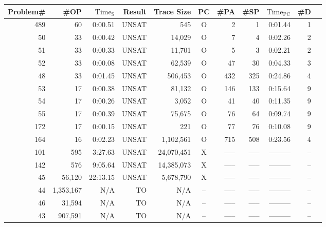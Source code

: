 \begin{table}[h]
  \begin{center}
    \begin{tabular}{|r||r|r|r||r||c|r|r|r|r|r|}
      \hline
      Problem\#&  \#OP  & $\mathrm{Time_S}$&    Result&     Trace Size& PC&  \#PA& \#SP& $\mathrm{Time_{PC}}$ & \#D\\
      \hline
      \hline
      489&       60&   0:00.51&     UNSAT&            545&O&    2&    1& 0:01.44& 1\\
      \hline
       50&       33&   0:00.42&     UNSAT&         14,029&O&    7&    4& 0:02.26& 2\\
      \hline
       51&       33&   0:00.33&     UNSAT&         11,701&O&    5&    3& 0:02.21& 2\\
      \hline
       52&       33&   0:00.08&     UNSAT&         62,539&O&   47&   30& 0:04.33& 3\\
      \hline
       48&       33&   0:01.45&     UNSAT&        506,453&O&  432&  325& 0:24.86& 4\\
      \hline
       53&       17&   0:00.38&     UNSAT&         81,132&O&  146&  133& 0:15.64& 9\\
      \hline
       54&       17&   0:00.26&     UNSAT&          3,052&O&   41&   40& 0:11.35& 9\\
      \hline
       55&       17&   0:00.39&     UNSAT&         75,675&O&   76&   64& 0:09.74& 9\\
      \hline
      172&       17&   0:00.15&     UNSAT&            221&O&   77&   76& 0:10.08& 9\\
      \hline
      164&       16&   0:02.23&     UNSAT&      1,102,561&O&  715&  508& 0:23.56& 4\\
      \hline
      \hline
      101&      595&   3:27.63&     UNSAT&     24,070,451&X&  -----& -----& --------- & --\\
      \hline
      142&      576&   9:05.64&     UNSAT&     14,385,073&X&  -----& -----& --------- & --\\
      \hline
       45&   56,120&  22:13.15&     UNSAT&      5,678,790&X&  -----& -----& --------- & --\\
      \hline
      \hline
       44&1,353,167&       N/A&       TO&             N/A&--&  -----& -----& --------- & --\\
      \hline
       46&   31,594&       N/A&       TO&             N/A&--&  -----& -----& --------- & --\\
      \hline
       43&  907,591&       N/A&       TO&             N/A&--&  -----& -----& --------- & --\\

\end{tabular}
\end{center}
\end{table}
